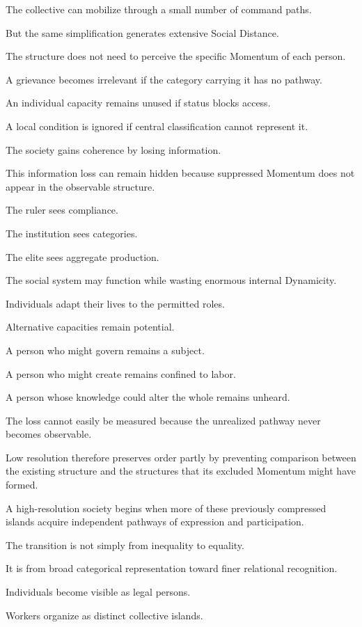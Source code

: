 The collective can mobilize through a small number of command paths.

But the same simplification generates extensive Social Distance.

The structure does not need to perceive the specific Momentum of each person.

A grievance becomes irrelevant if the category carrying it has no pathway.

An individual capacity remains unused if status blocks access.

A local condition is ignored if central classification cannot represent it.

The society gains coherence by losing information.

This information loss can remain hidden because suppressed Momentum does not appear in the observable structure.

The ruler sees compliance.

The institution sees categories.

The elite sees aggregate production.

The social system may function while wasting enormous internal Dynamicity.

Individuals adapt their lives to the permitted roles.

Alternative capacities remain potential.

A person who might govern remains a subject.

A person who might create remains confined to labor.

A person whose knowledge could alter the whole remains unheard.

The loss cannot easily be measured because the unrealized pathway never becomes observable.

Low resolution therefore preserves order partly by preventing comparison between the existing structure and the structures that its excluded Momentum might have formed.

A high-resolution society begins when more of these previously compressed islands acquire independent pathways of expression and participation.

The transition is not simply from inequality to equality.

It is from broad categorical representation toward finer relational recognition.

Individuals become visible as legal persons.

Workers organize as distinct collective islands.

